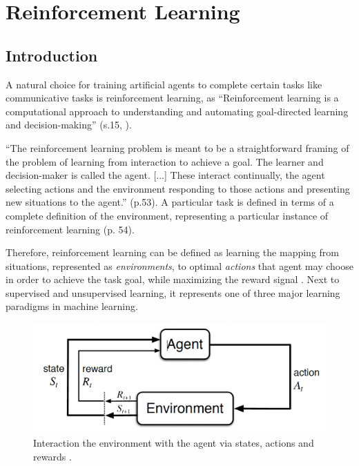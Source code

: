 \section{Reinforcement Learning}

\subsection{Introduction}
A natural choice for training artificial agents to complete certain tasks like communicative tasks is reinforcement learning, as ``Reinforcement learning is a computational approach to understanding and automating goal-directed learning and decision-making'' (s.15, \cite{sutton2018reinforcement}).

``The reinforcement learning problem is meant to be a straightforward framing of the problem of learning from interaction to achieve a goal. The learner and decision-maker is called the agent. [...] These interact continually, the agent selecting actions and the environment responding to those actions and presenting new situations to the agent.'' (p.53). A particular task is defined in terms of a complete definition of the environment, representing a particular instance of reinforcement learning (p. 54).

Therefore, reinforcement learning can be defined as learning the mapping from situations, represented as \textit{environments}, to optimal \textit{actions} that agent may choose in order to achieve the task goal, while maximizing the reward signal \parencite{sutton2018reinforcement}. Next to supervised and unsupervised learning, it represents one of three major learning paradigms in machine learning. 

\begin{figure}
	\centering
	\includegraphics[width=0.8\linewidth]{images/rl_intro.png}
	\caption{Interaction the environment with the agent via states, actions and rewards \parencite{sutton2018reinforcement}.}
	\label{fig:rl}
\end{figure}

